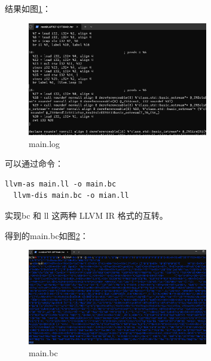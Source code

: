 \documentclass[UTF8,a4paper,10pt]{ctexart}
\begin{document}
结果如图\ref{fig:8}：
\begin{figure}[H]
    \centering
    \includegraphics[width=0.7\textwidth,height=0.7\textwidth]{imgs/mainlog.png}
    \caption{main.log}
    \label{fig:8}
\end{figure}


可以通过命令：
\begin{lstlisting}[frame=trbl]
  llvm-as main.ll -o main.bc
  llvm-dis main.bc -o mian.ll
\end{lstlisting}\par
实现bc 和 ll 这两种 LLVM IR 格式的互转。


得到的main.bc如图\ref{fig:9}：
\begin{figure}[H]
    \centering
    \includegraphics[width=0.7\textwidth,height=0.7\textwidth]{imgs/mainbc.png}
    \caption{main.bc}
    \label{fig:9}
\end{figure}
\end{document}
